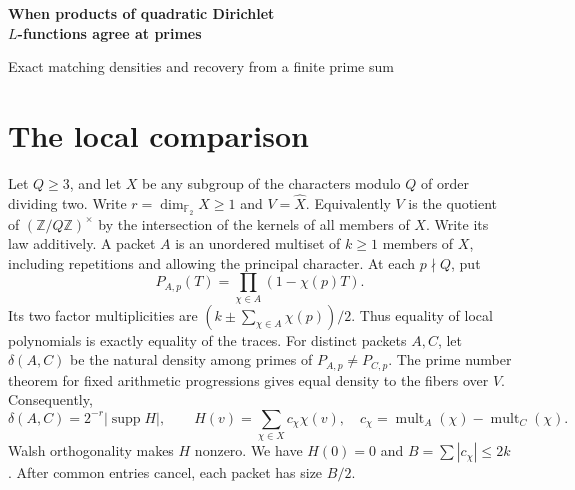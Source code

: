 \documentclass[11pt,letterpaper]{article}
\newcommand{\F}{\mathbb F_2}
\newcommand{\Z}{\mathbb Z}
\newcommand{\supp}{\operatorname{supp}}
\begin{document}
\begin{center}
{\Large\bfseries When products of quadratic Dirichlet\\[3pt]
\(L\)-functions agree at primes\par}
\vspace{7pt}
{\normalsize Exact matching densities and recovery from a finite prime sum}\par
\vspace{5pt}{\small November 26, 2026}
\end{center}
\begin{abstract}
For a product of \(k\) quadratic Dirichlet \(L\)-functions, how many local Euler factors can match those of a different product? We determine the maximum matching density, classify all maximizing pairs, and find every disagreement density below twice the minimum. After cancellation, each pair in this range has a prescribed number of distinct factors on either side. The density results are unconditional. Dirichlet GRH gives a uniform prime-counting error in the high-agreement range and a finite scale at which one smoothed count determines the exact density.
\end{abstract}

\section{The local comparison}
Let \(Q\ge3\), and let \(X\) be any subgroup of the characters modulo \(Q\) of order dividing two. Write \(r=\dim_{\F}X\ge1\) and \(V=\widehat X\). Equivalently \(V\) is the quotient of \((\Z/Q\Z)^\times\) by the intersection of the kernels of all members of \(X\). Write its law additively. A packet \(A\) is an unordered multiset of \(k\ge1\) members of \(X\), including repetitions and allowing the principal character. At each \(p\nmid Q\), put
\[
 P_{A,p}(T)=\prod_{\chi\in A}(1-\chi(p)T).
\]
Its two factor multiplicities are \((k\pm\sum_{\chi\in A}\chi(p))/2\). Thus equality of local polynomials is exactly equality of the traces. For distinct packets \(A,C\), let \(\delta(A,C)\) be the natural density among primes of \(P_{A,p}\ne P_{C,p}\). The prime number theorem for fixed arithmetic progressions gives equal density to the fibers over \(V\). Consequently,
\begin{equation}
 \delta(A,C)=2^{-r}|\supp H|,\qquad
 H(v)=\sum_{\chi\in X}c_\chi\chi(v),\quad
 c_\chi=\operatorname{mult}_A(\chi)-\operatorname{mult}_C(\chi).
 \label{finite}
\end{equation}
Walsh orthogonality makes \(H\) nonzero. We have \(H(0)=0\) and \(B=\sum|c_\chi|\le2k\). After common entries cancel, each packet has size \(B/2\).
\end{document}
